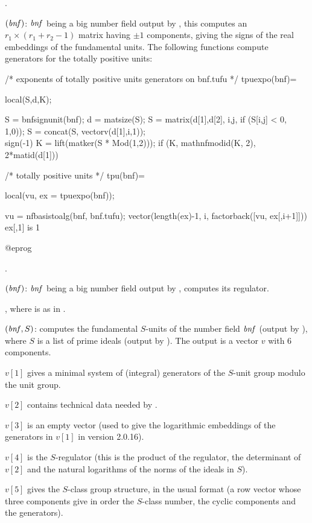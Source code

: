 .

$(\hbox{\it bnf\/})$: $\hbox{\it bnf\/}$ being a big number field
output by , this computes an $r_1\times(r_1+r_2-1)$ matrix
having $\pm1$ components, giving the signs of the real embeddings of the
fundamental units. The following functions compute generators for the totally
positive units:

\bprog
/* exponents of totally positive units generators on bnf.tufu */
tpuexpo(bnf)=
{ local(S,d,K);

  S = bnfsignunit(bnf); d = matsize(S);
  S = matrix(d[1],d[2], i,j, if (S[i,j] < 0, 1,0));
  S = concat(S, vectorv(d[1],i,1));   \\ sign(-1)
  K = lift(matker(S * Mod(1,2)));
  if (K, mathnfmodid(K, 2), 2*matid(d[1]))
}

/* totally positive units */
tpu(bnf)=
{ local(vu, ex = tpuexpo(bnf));

  vu = nfbasistoalg(bnf, bnf.tufu);
  vector(length(ex)-1, i, factorback([vu, ex[,i+1]]))  \\ ex[,1] is 1
}
@eprog

.

$(\hbox{\it bnf\/})$: $\hbox{\it bnf\/}$ being a big number field
output by , computes its regulator.

, where  is as in
.

$(\hbox{\it bnf\/},S)$: computes the fundamental $S$-units of the
number field $\hbox{\it bnf\/}$ (output by ), where $S$ is a list of
prime ideals (output by ). The output is a vector $v$ with
6 components.

$v[1]$ gives a minimal system of (integral) generators of the $S$-unit group
modulo the unit group.

$v[2]$ contains technical data needed by .

$v[3]$ is an empty vector (used to give the logarithmic embeddings of the
generators in $v[1]$ in version 2.0.16).

$v[4]$ is the $S$-regulator (this is the product of the regulator, the
determinant of $v[2]$ and the natural logarithms of the norms of the ideals
in $S$).

$v[5]$ gives the $S$-class group structure, in the usual format
(a row vector whose three components give in order the $S$-class number,
the cyclic components and the generators).

